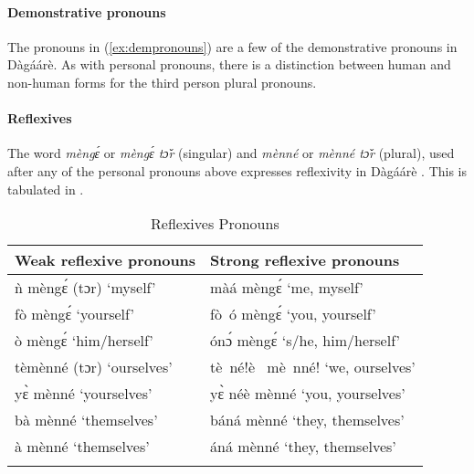 \paragraph{Demonstrative pronouns}

The pronouns in (\ref{ex:dempronouns}) are a few of the demonstrative pronouns in Dàgáárè. As
with personal pronouns, there is a distinction between human and non-human forms for the
third person plural pronouns.



\paragraph{Reflexives}
The word \textit{mèngɛ́} or \textit{mèngɛ́ tɔ̌r} (singular) and \textit{mènné} or \textit{mènné tɔ̌r} (plural), used
after any of the personal pronouns above expresses reflexivity in Dàgáárè . This is tabulated
in .

\begin{table}[]
    \centering
    \begin{tabular}{ll}\lsptoprule
Weak reflexive pronouns &  Strong reflexive pronouns \\\midrule
ǹ mèngɛ́ (tɔr) ‘myself’     & màá mèngɛ́ ‘me, myself’\\
fò mèngɛ́  ‘yourself’&fò~ó mèngɛ́ ‘you, yourself’\\
ò mèngɛ́  ‘him/herself’ &  ónɔ́ mèngɛ́ ‘s/he, him/herself’\\
tèmènné (tɔr) ‘ourselves’ &    tè~né!è~ mè~nné! ‘we, ourselves'\\
yɛ̀ mènné ‘yourselves’& yɛ̀ néè mènné ‘you, yourselves'\\
bà mènné ‘themselves’& báná mènné ‘they, themselves’ \\
à mènné ‘themselves’&áná mènné ‘they, themselves’\\\lspbottomrule
    \end{tabular}
    \caption{Reflexives Pronouns}
    \label{tab:reflexives}
\end{table}  


